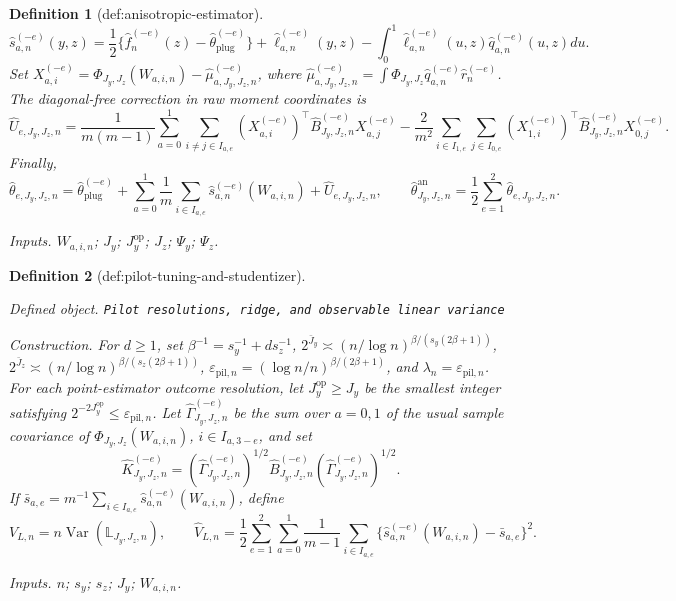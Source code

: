 \documentclass{article}
\newtheorem{definition}{Definition}
\begin{document}
\begin{definition}[def:anisotropic-estimator]
\[\widehat s_{a,n}^{(-e)}(y,z)=\frac12\{\widehat f_n^{(-e)}(z)-\widehat\theta_{\mathrm{plug}}^{(-e)}\}+\widehat\ell_{a,n}^{(-e)}(y,z)-\int_0^1\widehat\ell_{a,n}^{(-e)}(u,z)\widehat q_{a,n}^{(-e)}(u,z)du.
\]
Set \(X_{a,i}^{(-e)}=\Phi_{J_y,J_z}(W_{a,i,n})-\widehat\mu_{a,J_y,J_z,n}^{(-e)}\), where \(\widehat\mu_{a,J_y,J_z,n}^{(-e)}=\int\Phi_{J_y,J_z}\widehat q_{a,n}^{(-e)}\widehat r_n^{(-e)}\). The diagonal-free correction in raw moment coordinates is
\[
\widehat U_{e,J_y,J_z,n}=\frac{1}{m(m-1)}\sum_{a=0}^1\sum_{i\ne j\in I_{a,e}}(X_{a,i}^{(-e)})^\top\widehat B_{J_y,J_z,n}^{(-e)}X_{a,j}^{(-e)}-\frac{2}{m^2}\sum_{i\in I_{1,e}}\sum_{j\in I_{0,e}}(X_{1,i}^{(-e)})^\top\widehat B_{J_y,J_z,n}^{(-e)}X_{0,j}^{(-e)}.
\]
Finally,
\[
\widehat\theta_{e,J_y,J_z,n}=\widehat\theta_{\mathrm{plug}}^{(-e)}+\sum_{a=0}^1\frac1m\sum_{i\in I_{a,e}}\widehat s_{a,n}^{(-e)}(W_{a,i,n})+\widehat U_{e,J_y,J_z,n},
\qquad
\widehat\theta^{\mathrm{an}}_{J_y,J_z,n}=\frac12\sum_{e=1}^2\widehat\theta_{e,J_y,J_z,n}.
\]
\par\smallskip\noindent\emph{Inputs.} \(W_{a,i,n}\); \(J_y\); \(J_y^{\mathrm{op}}\); \(J_z\); \(\Psi_y\); \(\Psi_z\).
\end{definition}

\begin{definition}[def:pilot-tuning-and-studentizer]\label{def:pilot-tuning-and-studentizer}
\par\smallskip\noindent\emph{Defined object.} \texttt{Pilot resolutions,\allowbreak{} ridge,\allowbreak{} and observable linear variance}
\par\smallskip\noindent\emph{Construction.} For \(d\ge1\), set \(\beta^{-1}=s_y^{-1}+ds_z^{-1}\), \(2^{\bar J_y}\asymp(n/\log n)^{\beta/(s_y(2\beta+1))}\), \(2^{\bar J_z}\asymp(n/\log n)^{\beta/(s_z(2\beta+1))}\), \(\varepsilon_{\mathrm{pil},n}=(\log n/n)^{\beta/(2\beta+1)}\), and \(\lambda_n=\varepsilon_{\mathrm{pil},n}\). For each point-estimator outcome resolution, let \(J_y^{\mathrm{op}}\ge J_y\) be the smallest integer satisfying \(2^{-2J_y^{\mathrm{op}}}\le\varepsilon_{\mathrm{pil},n}\). Let \(\widehat\Gamma_{J_y,J_z,n}^{(-e)}\) be the sum over \(a=0,1\) of the usual sample covariance of \(\Phi_{J_y,J_z}(W_{a,i,n})\), \(i\in I_{a,3-e}\), and set
\[
\widehat K_{J_y,J_z,n}^{(-e)}=(\widehat\Gamma_{J_y,J_z,n}^{(-e)})^{1/2}\widehat B_{J_y,J_z,n}^{(-e)}(\widehat\Gamma_{J_y,J_z,n}^{(-e)})^{1/2}.
\]
If \(\bar s_{a,e}=m^{-1}\sum_{i\in I_{a,e}}\widehat s_{a,n}^{(-e)}(W_{a,i,n})\), define
\[
V_{L,n}=n\operatorname{Var}(\mathbb L_{J_y,J_z,n}),
\qquad
\widehat V_{L,n}=\frac12\sum_{e=1}^2\sum_{a=0}^1\frac{1}{m-1}\sum_{i\in I_{a,e}}\{\widehat s_{a,n}^{(-e)}(W_{a,i,n})-\bar s_{a,e}\}^2.
\]
\par\smallskip\noindent\emph{Inputs.} \(n\); \(s_y\); \(s_z\); \(J_y\); \(W_{a,i,n}\).
\end{definition}
\end{document}
